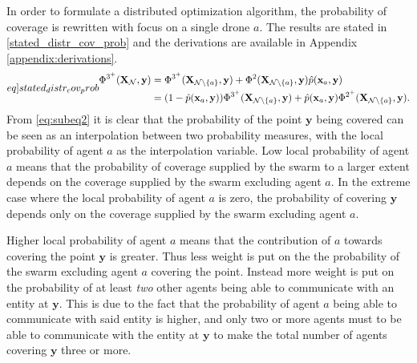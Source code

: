 In order to formulate a distributed optimization algorithm, the probability of coverage is rewritten with focus on a single drone $a$.
The results are stated in \eqref{stated_distr_cov_prob} and the derivations are available in Appendix \ref{appendix:derivations}.
\begin{subequations}\label[eq]{stated_distr_cov_prob}
  \begin{align}
    \Phi^{3^{+}}(\mathbf{X}_{\mathcal{N}}, \mathbf{y}) &= \Phi^{3^{+}}(\mathbf{X}_{\mathcal{N}\setminus\{a\}}, \mathbf{y}) + \Phi^{2}(\mathbf{X}_{\mathcal{N}\setminus\{a\}}, \mathbf{y})\hat{p}(\mathbf{x}_{a}, \mathbf{y})\label{eq:subeq1}\\
    &= (1-\hat{p}(\mathbf{x}_{a}, \mathbf{y}))\Phi^{3^{+}}(\mathbf{X}_{\mathcal{N}\setminus\{a\}}, \mathbf{y}) + \hat{p}(\mathbf{x}_{a}, \mathbf{y})\Phi^{2^{+}}(\mathbf{X}_{\mathcal{N}\setminus\{a\}}, \mathbf{y})\label{eq:subeq2}.
  \end{align}
\end{subequations}
From \eqref{eq:subeq2} it is clear that the probability of the point $\mathbf{y}$ being covered can be seen as an interpolation between two probability measures, 
with the local probability of agent $a$ as the interpolation variable. Low local probability of agent $a$ means that the probability of coverage supplied by the swarm to a larger extent depends on the coverage supplied by
the swarm excluding agent $a$. In the extreme case where the local probability of agent $a$ is zero, the probability of covering $\mathbf{y}$ depends only on the coverage supplied by the swarm excluding agent $a$.

Higher local probability of agent $a$ means that the contribution of $a$ towards covering the point $\mathbf{y}$ is greater. 
Thus less weight is put on the the probability of the swarm excluding agent $a$ covering the point. Instead more weight is put on the probability of at least \textit{two} other agents being able to communicate with an entity at $\mathbf{y}$. 
This is due to the fact that the probability of agent $a$ being able to communicate with said entity is higher, and only two or more agents must to be able to communicate with the entity at $\mathbf{y}$ to make the total number of agents covering $\mathbf{y}$ three or more.

